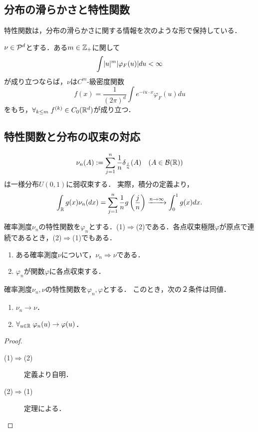 \documentclass[uplatex,dvipdfmx]{jsreport}
\begin{document}
\subsection{分布の滑らかさと特性関数}

\begin{tcolorbox}[colframe=ForestGreen, colback=ForestGreen!10!white,breakable,colbacktitle=ForestGreen!40!white,coltitle=black,fonttitle=\bfseries\sffamily,
title=]
    特性関数は，分布の滑らかさに関する情報を次のような形で保持している．
\end{tcolorbox}

\begin{proposition}
    $\nu\in\P^d$とする．ある$m\in\Z_+$に関して
    \[\int\abs{u}^m\abs{\varphi_F(u)}du<\infty\]
    が成り立つならば，$\nu$は$C^m$-級密度関数
    \[f(x)=\frac{1}{(2\pi)^d}\int e^{-iu\cdot x}\varphi_F(u)du\]
    をもち，$\forall_{k\le m}\;f^{(k)}\in C_0(\R^d)$が成り立つ．
\end{proposition}

\subsection{特性関数と分布の収束の対応}

\begin{example}
    \[\nu_n(A):=\sum^n_{j=1}\frac{1}{n}\delta_{\frac{j}{n}}(A)\quad(A\in\B(\R))\]
    は一様分布$U(0,1)$に弱収束する．
    実際，積分の定義より，
    \[\int_\R g(x)\nu_n(dx)=\sum^n_{j=1}\frac{1}{n}g\paren{\frac{j}{n}}\xrightarrow{n\to\infty}\int^1_0g(x)dx.\]
\end{example}

\begin{theorem}
    確率測度$\nu_n$の特性関数を$\varphi_n$とする．(1)$\Rightarrow$(2)である．各点収束極限$\varphi$が原点で連続であるとき，(2)$\Rightarrow$(1)でもある．
    \begin{enumerate}
        \item ある確率測度$\nu$について，$\nu_n\Rightarrow\nu$である．
        \item $\varphi_n$が関数$\varphi$に各点収束する．
    \end{enumerate}
\end{theorem}

\begin{corollary}[Glivenko]
    確率測度$\nu_n,\nu$の特性関数を$\varphi_n,\varphi$とする．
    このとき，次の２条件は同値．
    \begin{enumerate}
        \item $\nu_n\to\nu$．
        \item $\forall_{u\in\R}\;\varphi_n(u)\to\varphi(u)$．
    \end{enumerate}
\end{corollary}
\begin{proof}\mbox{}
    \begin{description}
        \item[(1)$\Rightarrow$(2)] 定義より自明．
        \item[(2)$\Rightarrow$(1)] 定理による．
    \end{description}
\end{proof}
\end{document}
